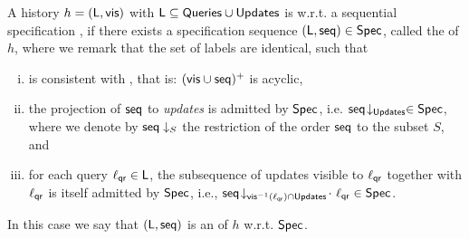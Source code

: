 
%


\begin{definition}
  \label{definition:ralinearizability1} A history $h =
  (\mathsf{L},\mathsf{vis})$ with $\mathsf{L}\subseteq \mathsf{Queries}\cup\mathsf{Updates}$ is \crdtlinearizable{} w.r.t. a
   sequential specification
  \Spec{}, if there exists a specification sequence
  $(\mathsf{L}, \mathsf{seq}) \in \mathsf{Spec}{}$, called the
  \emph{\crdtlinearization{}} of $h$, where we remark that the set of labels
  are identical, such that %
  \begin{enumerate}[(i)]
  \item \aseqord{} is consistent with  \avisord{}, that is: $(\mathsf{vis}
    \cup \mathsf{seq})^{+}$ is acyclic,
  \item the projection of $\mathsf{seq}$ to \emph{updates} is
    admitted by $\mathsf{Spec}$, i.e.
    $\mathsf{seq}\!\downarrow_{\mathsf{Updates}} \in \mathsf{Spec}$, where we denote by
    $\mathsf{seq}\downarrow_{S}$ the restriction of the order $\mathsf{seq}$ to
    the subset $S$, and
  \item for each query $\ell_{\mathsf{qr}}\in \mathsf{L}$, the subsequence of updates visible to $\ell_{\mathsf{qr}}$ together with $\ell_{\mathsf{qr}}$ is itself admitted by $\mathsf{Spec}$, i.e., $\mathsf{seq}\!\downarrow_{\mathsf{vis}^{-1}(\ell_{\mathsf{qr}})\cap \mathsf{Updates}}\!\cdot\
    \ell_{\mathsf{qr}} \in \mathsf{Spec}$.
\end{enumerate}
In this case we say that $(\mathsf{L}, \mathsf{seq})$ is an \emph{\crdtlinearization{}} of $h$ w.r.t. $\mathsf{Spec}{}$.
\end{definition}

